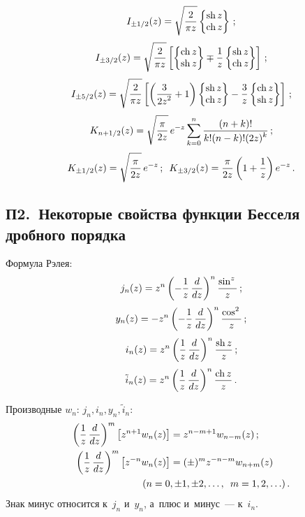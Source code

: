 \begin{multicols}{2}
{\noindent
    $$
    I_{\pm 1/2} (z) = \sqrt{\fr{2}{\pi z}} \left\{\begin{matrix}
    \mathrm{sh}\, z\\
\mathrm{ch}\, z\end{matrix}\right\}\,; 
 $$
 $$
 I_{\pm 3/2} (z) = \sqrt{\fr{2}{\pi z}}\lk \left\{\begin{matrix}
    \mathrm{ch}\, z\\
    \mathrm{sh}\, z\end{matrix} \right\} \mp \fr{1}{z} 
    \left\{\begin{matrix}
    \mathrm{sh}\, z\\
    \mathrm{ch}\, z\end{matrix} \right\}\rk\,;
    $$
$$
I_{\pm 5/2} (z) = \sqrt{\fr{2}{\pi z}}\lk\left(\fr{3}{2z^2}+1\right) \left\{\begin{matrix}
    \mathrm{sh}\, z\\
    \mathrm{ch}\, z\end{matrix} \right\} - \fr{3}{z} \left\{\begin{matrix}
    \mathrm{ch}\, z\\
    \mathrm{sh}\, z\end{matrix} \right\}\rk\,;
    $$
    $$
    K_{n+1/2}(z) = \sqrt{\fr{\pi}{2 z}}\,e^{-z} \sss_{k=0}^n 
    \fr{(n+k)!}{k!(n-k)! (2z)^k}\,;
    $$
    $$
    K_{\pm 1/2} (z) = \sqrt{\fr{\pi}{2 z}}\,e^{-z}\,;\enskip 
    K_{\pm 3/2} (z) = \fr{\pi}{2z} \left(1+\fr{1}{z}\right) e^{-z}\,.
    $$
    
    


\subsection*{П2.\ Некоторые свойства функции \hphantom{П2.\ }Бесселя дробного порядка} 


{Формула Рэлея:}
    $$
    j_n (z) = z^n \left(-\fr{1}{z}\,\fr{d}{dz}\right)^n \fr{\sin^z}{z}\,;$$
    $$
    y_n (z) = -z^n \left(-\fr{1}{z}\,\fr{d}{dz}\right)^n \fr{\cos^2}{z}\,;
    $$
    $$
    i_n (z) = z^n \left(\fr{1}{z}\,\fr{d}{dz}\right)^n \fr{\mathrm{sh}\, z}{z}\,;
    $$
    $$
    \tilde i_n (z) = z^n \left(\fr{1}{z}\,\fr{d}{dz}\right)^n 
    \fr{\mathrm{ch}\, z}{z}\,.
    $$

{Производные $w_n$: $j_n, i_n, y_n, \tilde i_n$:}
    \begin{align*}
    \left(\fr{1}{z}\,\fr{d}{dz}\right)^m \lk z^{n+1} w_n (z)\rk &= 
    z^{n-m+1} w_{n-m} (z)\,;\\
    \left(\fr{1}{z}\, \fr{d}{dz}\right)^m \lk z^{-n} w_n (z)\rk& =
    (\pm)^m z^{-n-m} w_{n+m} (z)
    \\
    &\hspace*{-10mm}(n=0,\pm 1,\pm 2,\ldots,\enskip m= 1, 2,\ldots)\,.
   \end{align*}
Знак минус относится к~$j_n$ и~$y_n$, а~плюс и~минус~--- к~$i_n$.

}
\end{multicols}
